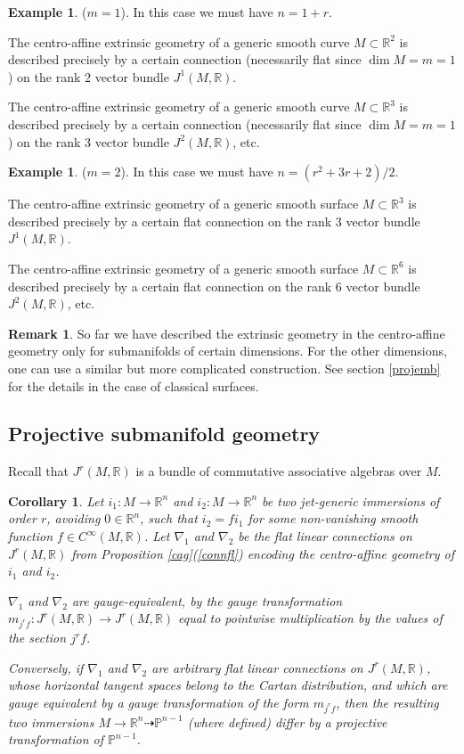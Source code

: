 \documentclass[12pt]{article}
\numberwithin{equation}{section}
\theoremstyle{plain}
\newtheorem{corollary}[definition]{Corollary}
\theoremstyle{definition}
\newtheorem{remark}[definition]{Remark}
\newtheorem{example}[definition]{Example}
\renewcommand{\P}{\mathbb{P}}
\newcommand{\R}{\mathbb{R}}
\newcommand{\ra}{\rightarrow}
\begin{document}
\begin{example} ($m=1$). In this case we must have $n=1+r$.

The centro-affine extrinsic geometry of a generic smooth curve $M\subset\R^{2}$ is described precisely by a certain connection (necessarily flat since $\dim M = m = 1$) on the rank 2 vector bundle $J^{1}(M,\R)$. 

The centro-affine extrinsic geometry of a generic smooth curve $M\subset\R^{3}$ is described precisely by a certain connection (necessarily flat since $\dim M = m = 1$) on the rank 3 vector bundle $J^{2}(M,\R)$, etc.
\end{example}
\begin{example} ($m=2$). In this case we must have $n=(r^2+3r+2)/2$.

The centro-affine extrinsic geometry of a generic smooth surface $M\subset\R^{3}$ is described precisely by a certain flat connection on the rank 3 vector bundle $J^{1}(M,\R)$.

The centro-affine extrinsic geometry of a generic smooth surface $M\subset\R^{6}$ is described precisely by a certain flat connection on the rank 6 vector bundle $J^{2}(M,\R)$, etc. 
\end{example}

\begin{remark}
So far we have described the extrinsic geometry in the centro-affine geometry only for submanifolds of certain dimensions. For the other dimensions, one can use a similar but more complicated construction. See section \ref{projemb} for the details in the case of classical surfaces.
\end{remark}

\subsection{Projective submanifold geometry}\label{projegeom}

Recall that $J^{r}(M,\R)$ is a bundle of commutative associative algebras over $M$.

\begin{corollary}\label{i1i2} Let $i_{1}:M\ra \R^{n}$ and $i_{2}:M\ra \R^{n}$ be two jet-generic immersions of order $r$, avoiding $0\in \R^{n}$, such that $i_{2}=fi_{1}$ for some non-vanishing smooth function $f\in C^{\infty}(M,\R)$. Let $\nabla_{1}$ and $\nabla_{2}$ be the flat linear connections on $J^{r}(M,\R)$ from Proposition \ref{cag}(\ref{connfl}) encoding the centro-affine geometry of $i_1$ and $i_2$.

$\nabla_{1}$ and $\nabla_{2}$ are gauge-equivalent, by the gauge transformation $m_{j^{r}f}:J^{r}(M,\R)\ra J^{r}(M,\R)$ equal to pointwise multiplication by the values of the section $j^{r}f$.

Conversely, if $\nabla_{1}$ and $\nabla_{2}$ are arbitrary flat linear connections on $J^{r}(M,\R)$, whose horizontal tangent spaces belong to the Cartan distribution, and which are gauge equivalent by a gauge transformation of the form $m_{j^{r}f}$, then the resulting two immersions $M\ra \R^{n}\dashrightarrow \P^{n-1}$ (where defined) differ by a projective transformation of $\P^{n-1}$.
\end{corollary}
\end{document}
